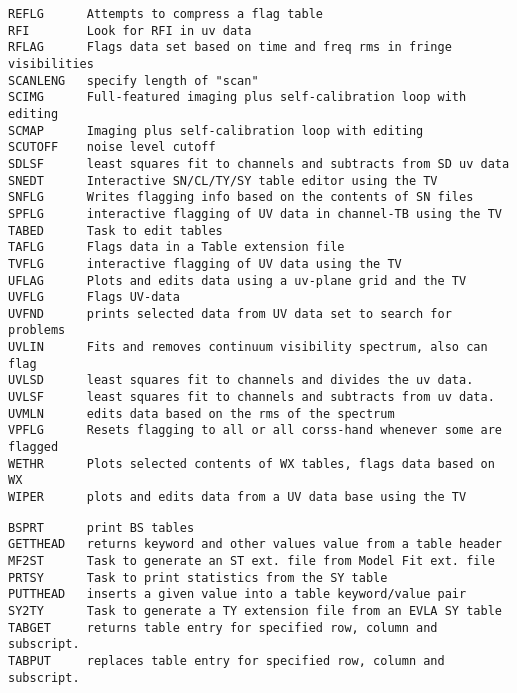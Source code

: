 \begin{verbatim}
REFLG      Attempts to compress a flag table
RFI        Look for RFI in uv data
RFLAG      Flags data set based on time and freq rms in fringe visibilities
SCANLENG   specify length of "scan"
SCIMG      Full-featured imaging plus self-calibration loop with editing
SCMAP      Imaging plus self-calibration loop with editing
SCUTOFF    noise level cutoff
SDLSF      least squares fit to channels and subtracts from SD uv data
SNEDT      Interactive SN/CL/TY/SY table editor using the TV
SNFLG      Writes flagging info based on the contents of SN files
SPFLG      interactive flagging of UV data in channel-TB using the TV
TABED      Task to edit tables
TAFLG      Flags data in a Table extension file
TVFLG      interactive flagging of UV data using the TV
UFLAG      Plots and edits data using a uv-plane grid and the TV
UVFLG      Flags UV-data
UVFND      prints selected data from UV data set to search for problems
UVLIN      Fits and removes continuum visibility spectrum, also can flag
UVLSD      least squares fit to channels and divides the uv data.
UVLSF      least squares fit to channels and subtracts from uv data.
UVMLN      edits data based on the rms of the spectrum
VPFLG      Resets flagging to all or all corss-hand whenever some are flagged
WETHR      Plots selected contents of WX tables, flags data based on WX
WIPER      plots and edits data from a UV data base using the TV
\end{verbatim}\eve

{}

\vskip 0.5pt
\bbve\begin{verbatim}
BSPRT      print BS tables
GETTHEAD   returns keyword and other values value from a table header
MF2ST      Task to generate an ST ext. file from Model Fit ext. file
PRTSY      Task to print statistics from the SY table
PUTTHEAD   inserts a given value into a table keyword/value pair
SY2TY      Task to generate a TY extension file from an EVLA SY table
TABGET     returns table entry for specified row, column and subscript.
TABPUT     replaces table entry for specified row, column and subscript.
\end{verbatim}\eve


